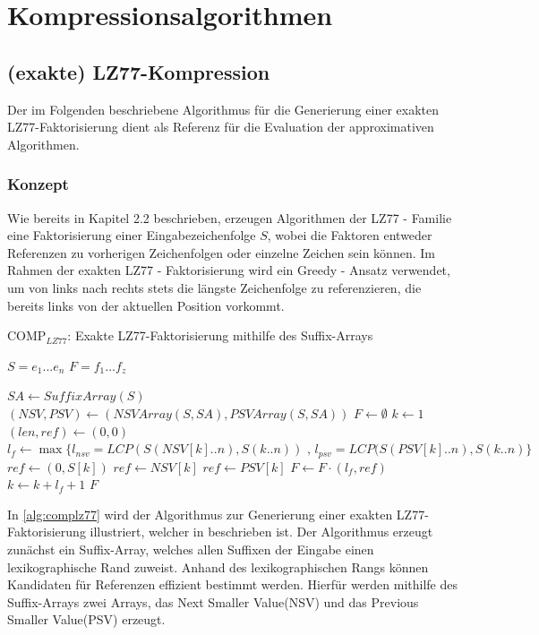 \chapter{Kompressionsalgorithmen}

\section{(exakte) LZ77-Kompression}
Der im Folgenden beschriebene Algorithmus für die Generierung einer exakten LZ77-Faktorisierung dient als Referenz für die Evaluation der approximativen Algorithmen.

\subsection{Konzept}
Wie bereits in Kapitel 2.2 beschrieben, erzeugen Algorithmen der LZ77 - Familie eine Faktorisierung einer Eingabezeichenfolge $S$, wobei die Faktoren entweder Referenzen
zu vorherigen Zeichenfolgen oder einzelne Zeichen sein können. Im Rahmen der exakten LZ77 - Faktorisierung wird ein Greedy - Ansatz verwendet, um von links nach rechts 
stets die längste Zeichenfolge zu referenzieren, die bereits links von der aktuellen Position vorkommt.
\begin{algorithm}[ht]
\centering
\caption{COMP$_{LZ77}$: Exakte LZ77-Faktorisierung mithilfe des Suffix-Arrays} \label{alg:complz77}
\algorithmicrequire $S=e_1...e_n$
\algorithmicensure $F=f_1...f_z$
\begin{algorithmic}
    \STATE $SA \gets SuffixArray(S)$
    \STATE $(NSV, PSV) \gets (NSVArray(S, SA), PSVArray(S, SA))$
    \STATE $F \gets \emptyset$
    \STATE $k \gets 1$
    \STATE $(len, ref) \gets (0, 0)$
    \STATE $l_{f} \gets \max\{l_{nsv}=LCP(S(NSV[k]..n), S(k..n))\text{ , } l_{psv}=LCP(S(PSV[k]..n), S(k..n)\}$
        \STATE $ref \gets (0, S[k])$
        \STATE $ref \gets NSV[k]$
    \ELSE
        \STATE $ref \gets PSV[k]$
    \ENDIF
    \STATE $F \gets F \cdot (l_f, ref)$
    \STATE $k \gets k + l_f + 1$
    \ENDWHILE
    \RETURN $F$
\end{algorithmic}
\end{algorithm}
In \ref{alg:complz77} wird der Algorithmus zur Generierung einer exakten LZ77-Faktorisierung illustriert, welcher in \cite{exactLemZiv} beschrieben ist. Der 
Algorithmus erzeugt zunächst ein Suffix-Array, welches allen Suffixen der Eingabe einen lexikographische Rand zuweist. Anhand des lexikographischen Rangs 
können Kandidaten für Referenzen effizient bestimmt werden. Hierfür werden mithilfe des Suffix-Arrays zwei Arrays, das Next Smaller Value(NSV) und das 
Previous Smaller Value(PSV) erzeugt.

